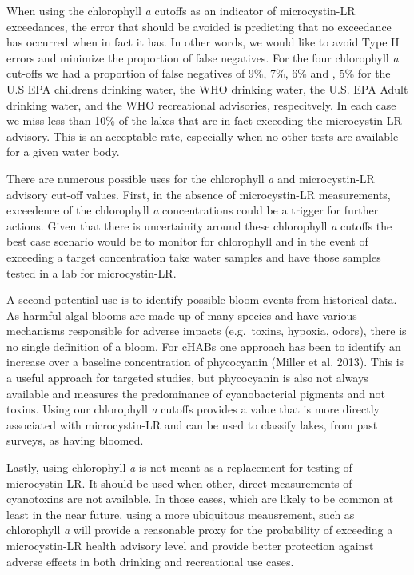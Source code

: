 \documentclass[11pt,]{article}
\begin{document}
When using the chlorophyll \emph{a} cutoffs as an indicator of
microcystin-LR exceedances, the error that should be avoided is
predicting that no exceedance has occurred when in fact it has. In other
words, we would like to avoid Type II errors and minimize the proportion
of false negatives. For the four chlorophyll \emph{a} cut-offs we had a
proportion of false negatives of 9\%, 7\%, 6\% and , 5\% for the U.S EPA
childrens drinking water, the WHO drinking water, the U.S. EPA Adult
drinking water, and the WHO recreational advisories, respecitvely. In
each case we miss less than 10\% of the lakes that are in fact exceeding
the microcystin-LR advisory. This is an acceptable rate, especially when
no other tests are available for a given water body.

There are numerous possible uses for the chlorophyll \emph{a} and
microcystin-LR advisory cut-off values. First, in the absence of
microcystin-LR measurements, exceedence of the chlorophyll \emph{a}
concentrations could be a trigger for further actions. Given that there
is uncertainity around these chlorophyll \emph{a} cutoffs the best case
scenario would be to monitor for chlorophyll and in the event of
exceeding a target concentration take water samples and have those
samples tested in a lab for microcystin-LR.

A second potential use is to identify possible bloom events from
historical data. As harmful algal blooms are made up of many species and
have various mechanisms responsible for adverse impacts (e.g.~toxins,
hypoxia, odors), there is no single definition of a bloom. For cHABs one
approach has been to identify an increase over a baseline concentration
of phycocyanin (Miller et al. 2013). This is a useful approach for
targeted studies, but phycocyanin is also not always available and
measures the predominance of cyanobacterial pigments and not toxins.
Using our chlorophyll \emph{a} cutoffs provides a value that is more
directly associated with microcystin-LR and can be used to classify
lakes, from past surveys, as having bloomed.

Lastly, using chlorophyll \emph{a} is not meant as a replacement for
testing of microcystin-LR. It should be used when other, direct
measurements of cyanotoxins are not available. In those cases, which are
likely to be common at least in the near future, using a more ubiquitous
meausrement, such as chlorophyll \emph{a} will provide a reasonable
proxy for the probability of exceeding a microcystin-LR health advisory
level and provide better protection against adverse effects in both
drinking and recreational use cases.
\end{document}
